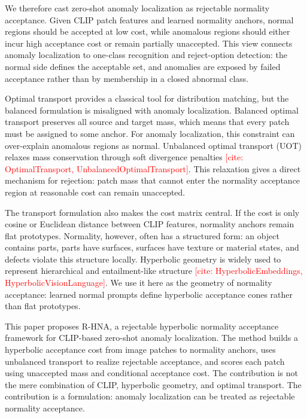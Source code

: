 \documentclass[10pt]{article}
\newcommand{\method}{R-HNA}
\newcommand{\needcite}[1]{\textcolor{red}{[cite: #1]}}
\begin{document}
We therefore cast zero-shot anomaly localization as rejectable normality acceptance.
Given CLIP patch features and learned normality anchors, normal regions should be accepted at low cost, while anomalous regions should either incur high acceptance cost or remain partially unaccepted.
This view connects anomaly localization to one-class recognition and reject-option detection: the normal side defines the acceptable set, and anomalies are exposed by failed acceptance rather than by membership in a closed abnormal class.

Optimal transport provides a classical tool for distribution matching, but the balanced formulation is misaligned with anomaly localization.
Balanced optimal transport preserves all source and target mass, which means that every patch must be assigned to some anchor.
For anomaly localization, this constraint can over-explain anomalous regions as normal.
Unbalanced optimal transport (UOT) relaxes mass conservation through soft divergence penalties \needcite{OptimalTransport, UnbalancedOptimalTransport}.
This relaxation gives a direct mechanism for rejection: patch mass that cannot enter the normality acceptance region at reasonable cost can remain unaccepted.

The transport formulation also makes the cost matrix central.
If the cost is only cosine or Euclidean distance between CLIP features, normality anchors remain flat prototypes.
Normality, however, often has a structured form: an object contains parts, parts have surfaces, surfaces have texture or material states, and defects violate this structure locally.
Hyperbolic geometry is widely used to represent hierarchical and entailment-like structure \needcite{HyperbolicEmbeddings, HyperbolicVisionLanguage}.
We use it here as the geometry of normality acceptance: learned normal prompts define hyperbolic acceptance cones rather than flat prototypes.

This paper proposes \method{}, a rejectable hyperbolic normality acceptance framework for CLIP-based zero-shot anomaly localization.
The method builds a hyperbolic acceptance cost from image patches to normality anchors, uses unbalanced transport to realize rejectable acceptance, and scores each patch using unaccepted mass and conditional acceptance cost.
The contribution is not the mere combination of CLIP, hyperbolic geometry, and optimal transport.
The contribution is a formulation: anomaly localization can be treated as rejectable normality acceptance.
\end{document}

